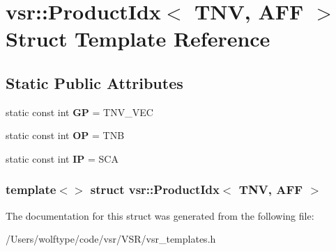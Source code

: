 \hypertarget{structvsr_1_1_product_idx_3_01_t_n_v_00_01_a_f_f_01_4}{\section{vsr\-:\-:Product\-Idx$<$ T\-N\-V, A\-F\-F $>$ Struct Template Reference}
\label{structvsr_1_1_product_idx_3_01_t_n_v_00_01_a_f_f_01_4}
}
\subsection*{Static Public Attributes}
\begin{DoxyCompactItemize}
\item 
\hypertarget{structvsr_1_1_product_idx_3_01_t_n_v_00_01_a_f_f_01_4_a7e4494ef88b0a8758dd8bf291d2b9cd3}{static const int {\bfseries G\-P} = T\-N\-V\-\_\-\-V\-E\-C}\label{structvsr_1_1_product_idx_3_01_t_n_v_00_01_a_f_f_01_4_a7e4494ef88b0a8758dd8bf291d2b9cd3}

\item 
\hypertarget{structvsr_1_1_product_idx_3_01_t_n_v_00_01_a_f_f_01_4_a0a53461d3701a9fd4148c81ac5299ea9}{static const int {\bfseries O\-P} = T\-N\-B}\label{structvsr_1_1_product_idx_3_01_t_n_v_00_01_a_f_f_01_4_a0a53461d3701a9fd4148c81ac5299ea9}

\item 
\hypertarget{structvsr_1_1_product_idx_3_01_t_n_v_00_01_a_f_f_01_4_a43469dd7f3d5923b7b932fc75094603e}{static const int {\bfseries I\-P} = S\-C\-A}\label{structvsr_1_1_product_idx_3_01_t_n_v_00_01_a_f_f_01_4_a43469dd7f3d5923b7b932fc75094603e}

\end{DoxyCompactItemize}
\subsubsection*{template$<$$>$ struct vsr\-::\-Product\-Idx$<$ T\-N\-V, A\-F\-F $>$}



The documentation for this struct was generated from the following file\-:\begin{DoxyCompactItemize}
\item 
/\-Users/wolftype/code/vsr/\-V\-S\-R/vsr\-\_\-templates.\-h\end{DoxyCompactItemize}
